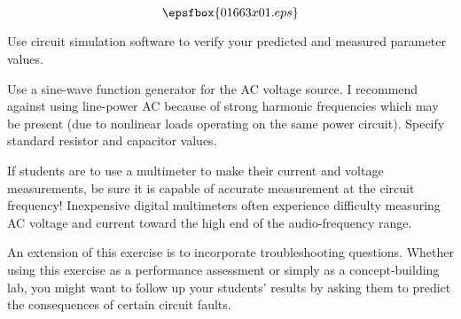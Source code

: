 

$$\epsfbox{01663x01.eps}$$

\vfil \eject






Use circuit simulation software to verify your predicted and measured parameter values.







Use a sine-wave function generator for the AC voltage source.  I recommend against using line-power AC because of strong harmonic frequencies which may be present (due to nonlinear loads operating on the same power circuit).  Specify standard resistor and capacitor values.

If students are to use a multimeter to make their current and voltage measurements, be sure it is capable of accurate measurement at the circuit frequency!  Inexpensive digital multimeters often experience difficulty measuring AC voltage and current toward the high end of the audio-frequency range.

An extension of this exercise is to incorporate troubleshooting questions.  Whether using this exercise as a performance assessment or simply as a concept-building lab, you might want to follow up your students' results by asking them to predict the consequences of certain circuit faults.




